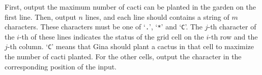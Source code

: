 First, output the maximum number of cacti can be planted in the garden on the
first line. Then, output $n$ lines, and each line should contains a string of 
$m$ characters.
These characters must be one of `\verb+.+', `\verb+*+' and `\verb+C+'.
The $j$-th character of the $i$-th of these lines indicates the status of
the grid cell on the $i$-th row and the $j$-th column.
`\verb+C+' means that Gina should plant a cactus in that cell to maximize the
number of cacti planted.
For the other cells, output the character in the corresponding position of the
input.
